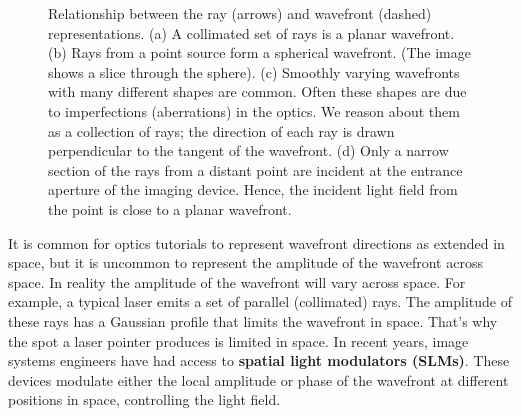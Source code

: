 \documentclass[
  letterpaper,
]{book}
\begin{document}
\begin{figure}


\caption{\label{fig-waves-rays}Relationship between the ray (arrows) and
wavefront (dashed) representations. (a) A collimated set of rays is a
planar wavefront. (b) Rays from a point source form a spherical
wavefront. (The image shows a slice through the sphere). (c) Smoothly
varying wavefronts with many different shapes are common. Often these
shapes are due to imperfections (aberrations) in the optics. We reason
about them as a collection of rays; the direction of each ray is drawn
perpendicular to the tangent of the wavefront. (d) Only a narrow section
of the rays from a distant point are incident at the entrance aperture
of the imaging device. Hence, the incident light field from the point is
close to a planar wavefront.}

\end{figure}%

It is common for optics tutorials to represent wavefront directions as
extended in space, but it is uncommon to represent the amplitude of the
wavefront across space. In reality the amplitude of the wavefront will
vary across space. For example, a typical laser emits a set of parallel
(collimated) rays. The amplitude of these rays has a Gaussian profile
that limits the wavefront in space. That's why the spot a laser pointer
produces is limited in space. In recent years, image systems engineers
have had access to \textbf{spatial light modulators (SLMs)}. These
devices modulate either the local amplitude or phase of the wavefront at
different positions in space, controlling the light field.
\end{document}
